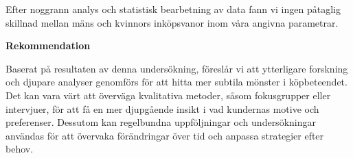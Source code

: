 \documentclass[letter,11pt]{report}
\begin{document}
Efter noggrann analys och statistisk bearbetning av data fann vi ingen påtaglig skillnad mellan mäns och kvinnors inköpsvanor inom våra angivna parametrar.

\vspace{3ex} %
{\large \textbf{Rekommendation}}
\vspace{2ex} %

Baserat på resultaten av denna undersökning, föreslår vi att ytterligare forskning och djupare analyser genomförs för att hitta mer subtila mönster i köpbeteendet. Det kan vara värt att överväga kvalitativa metoder, såsom fokusgrupper eller intervjuer, för att få en mer djupgående insikt i vad kundernas motive och preferenser. Dessutom kan regelbundna uppföljningar och undersökningar användas för att övervaka förändringar över tid och anpassa strategier efter behov.
\end{document}
